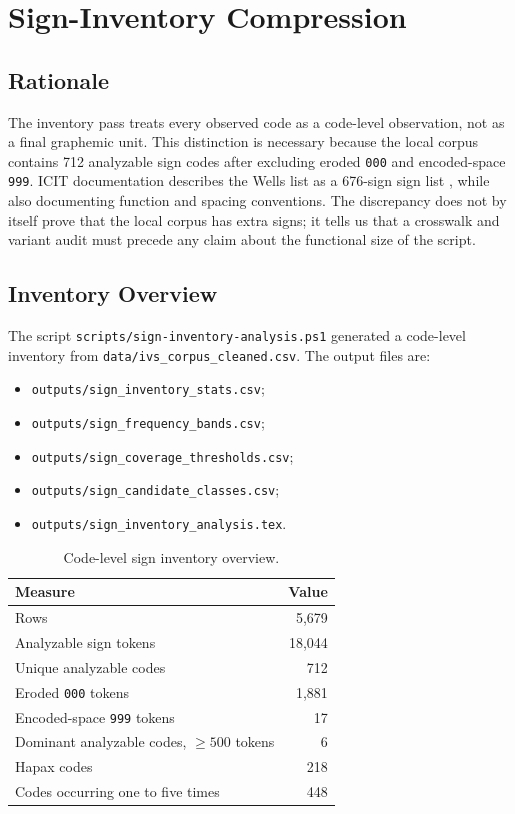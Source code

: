 \section{Sign-Inventory Compression}

\subsection{Rationale}

The inventory pass treats every observed code as a code-level observation, not as a final graphemic unit. This distinction is necessary because the local corpus contains 712 analyzable sign codes after excluding eroded \texttt{000} and encoded-space \texttt{999}. ICIT documentation describes the Wells list as a 676-sign sign list \citep{fulsICIT}, while also documenting function and spacing conventions. The discrepancy does not by itself prove that the local corpus has extra signs; it tells us that a crosswalk and variant audit must precede any claim about the functional size of the script.

\subsection{Inventory Overview}

The script \texttt{scripts/sign-inventory-analysis.ps1} generated a code-level inventory from \texttt{data/ivs\_corpus\_cleaned.csv}. The output files are:

\begin{itemize}
  \item \texttt{outputs/sign\_inventory\_stats.csv};
  \item \texttt{outputs/sign\_frequency\_bands.csv};
  \item \texttt{outputs/sign\_coverage\_thresholds.csv};
  \item \texttt{outputs/sign\_candidate\_classes.csv};
  \item \texttt{outputs/sign\_inventory\_analysis.tex}.
\end{itemize}

\begin{table}[htbp]
\centering
\begin{tabular}{lr}
\toprule
\textbf{Measure} & \textbf{Value} \\
\midrule
Rows & 5,679 \\
Analyzable sign tokens & 18,044 \\
Unique analyzable codes & 712 \\
Eroded \texttt{000} tokens & 1,881 \\
Encoded-space \texttt{999} tokens & 17 \\
Dominant analyzable codes, $\geq 500$ tokens & 6 \\
Hapax codes & 218 \\
Codes occurring one to five times & 448 \\
\bottomrule
\end{tabular}
\caption{Code-level sign inventory overview.}
\label{tab:inventory-overview}
\end{table}

